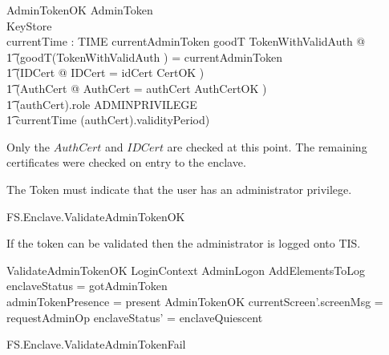 \begin{schema}{AdminTokenOK}
        AdminToken
\\      KeyStore
\\      currentTime : TIME        
\where
        currentAdminToken \in \ran goodT
\also
        \exists TokenWithValidAuth @
\\ \t1  (goodT(\theta TokenWithValidAuth )  = currentAdminToken
\\ \t1  \land (\exists IDCert @ \theta IDCert = idCert \land CertOK )
\\ \t1  \land (\exists AuthCert @ \theta AuthCert = \The authCert \land
AuthCertOK )
\\ \t1  \land (\The authCert).role \in ADMINPRIVILEGE 
\\ \t1  \land currentTime \in (\The authCert).validityPeriod)
\end{schema}
\begin{Zcomment}
\item
Only the $AuthCert$  and $IDCert$ are checked at this point. The remaining
certificates were checked on entry to the enclave.
\item
The Token must indicate that the user has an administrator privilege.
\end{Zcomment}

\begin{traceunit}{FS.Enclave.ValidateAdminTokenOK}
\end{traceunit}


If the token can be validated then the administrator is logged onto
TIS.

\begin{schema}{ValidateAdminTokenOK}
        LoginContext
\also
        AdminLogon
\also
        AddElementsToLog
\where
        enclaveStatus = gotAdminToken
\\      adminTokenPresence = present
\also
        AdminTokenOK
\also   
        currentScreen'.screenMsg = requestAdminOp 
\also
        enclaveStatus' = enclaveQuiescent
\end{schema}

\begin{traceunit}{FS.Enclave.ValidateAdminTokenFail}
\end{traceunit}

